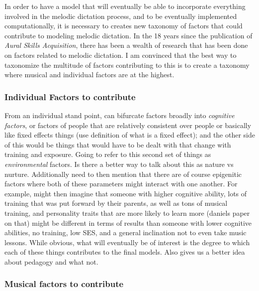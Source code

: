\documentclass[]{book}
\theoremstyle{definition}
\theoremstyle{definition}
\theoremstyle{definition}
\theoremstyle{remark}
\begin{document}
In order to have a model that will eventually be able to incorporate
everything involved in the melodic dictation process, and to be
eventually implemented computationally, it is necessary to creates new
taxonomy of factors that could contribute to modeling melodic dictation.
In the 18 years since the publication of \emph{Aural Skills
Acquisition}, there has been a wealth of research that has been done on
factors related to melodic dictation. I am convinced that the best way
to taxonomize the multitude of factors contributing to this is to create
a taxonomy where musical and individual factors are at the highest.

\hypertarget{individual-factors-to-contribute}{%
\subsubsection{Individual Factors to
contribute}\label{individual-factors-to-contribute}}

From an individual stand point, can bifurcate factors broadly into
\emph{cognitive factors}, or factors of people that are relatively
consistent over people or basically like fixed effects things (use
definition of what is a fixed effect); and the other side of this would
be things that would have to be dealt with that change with training and
exposure. Going to refer to this second set of things as
\emph{environmental} factors. Is there a better way to talk about this
as nature vs nurture. Additionally need to then mention that there are
of course epigenitic factors where both of these parameters might
interact with one another. For example, might then imagine that someone
with higher cognitive ability, lots of training that was put forward by
their parents, as well as tons of musical training, and personality
traits that are more likely to learn more (daniels paper on that) might
be different in terms of results than someone with lower cognitive
abilities, no training, low SES, and a general inclination not to even
take music lessons. While obvious, what will eventually be of interest
is the degree to which each of these things contributes to the final
models. Also gives us a better idea about pedagogy and what not.

\hypertarget{musical-factors-to-contribute}{%
\subsubsection{Musical factors to
contribute}\label{musical-factors-to-contribute}}
\end{document}
